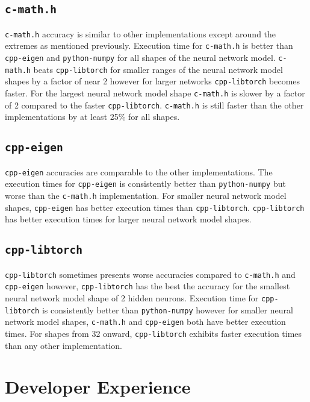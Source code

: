 \subsection{\texttt{c-math.h}}

\texttt{c-math.h} accuracy is similar to other implementations except around the extremes as mentioned previously. Execution time for \texttt{c-math.h} is better than \texttt{cpp-eigen} and \texttt{python-numpy} for all shapes of the neural network model. \texttt{c-math.h} beats \texttt{cpp-libtorch} for smaller ranges of the neural network model shapes by a factor of near 2 however for larger networks \texttt{cpp-libtorch} becomes faster. For the largest neural network model shape \texttt{c-math.h} is slower by a factor of 2 compared to the faster \texttt{cpp-libtorch}. \texttt{c-math.h} is still faster than the other implementations by at least 25\% for all shapes.

\subsection{\texttt{cpp-eigen}}

\texttt{cpp-eigen} accuracies are comparable to the other implementations. The execution times for \texttt{cpp-eigen} is consistently better than \texttt{python-numpy} but worse than the \texttt{c-math.h} implementation. For smaller neural network model shapes, \texttt{cpp-eigen} has better execution times than \texttt{cpp-libtorch}. \texttt{cpp-libtorch} has better execution times for larger neural network model shapes.

\subsection{\texttt{cpp-libtorch}}

\texttt{cpp-libtorch} sometimes presents worse accuracies compared to \texttt{c-math.h} and \texttt{cpp-eigen} however, \texttt{cpp-libtorch} has the best the accuracy for the smallest neural network model shape of 2 hidden neurons. Execution time for \texttt{cpp-libtorch} is consistently better than \texttt{python-numpy} however for smaller neural network model shapes, \texttt{c-math.h} and \texttt{cpp-eigen} both have better execution times. For shapes from 32 onward, \texttt{cpp-libtorch} exhibits faster execution times than any other implementation.

\section{Developer Experience}

